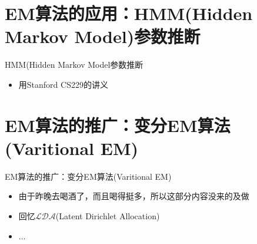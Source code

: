 \documentclass[noindent]{beamer}
\begin{document}
\section{EM算法的应用：HMM(Hidden Markov Model)参数推断}
\begin{frame}{HMM(Hidden Markov Model参数推断}
\begin{itemize}
\item 用Stanford CS229的讲义
\end{itemize}
\end{frame}


\section{EM算法的推广：变分EM算法(Varitional EM)}
\begin{frame}{EM算法的推广：变分EM算法(Varitional EM)}
\begin{itemize}
\pause
\item 由于昨晚去喝酒了，而且喝得挺多，所以这部分内容没来的及做
\item 回忆$\mathcal{LDA}$(Latent Dirichlet Allocation)
\item $\ldots$
\end{itemize}
\end{frame}
\end{document}
